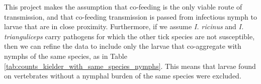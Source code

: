 \documentclass{article}
\begin{document}
This project makes the assumption that co-feeding is the only viable route of transmission, and that co-feeding transmission is passed from infectious nymph to larvae that are in close proximity. Furthermore, if we assume \textit{I. ricinus} and \textit{I. trianguliceps} carry pathogens for which the other tick species are not susceptible, then we can refine the data to include only the larvae that co-aggregate with nymphs of the same species, as in Table \ref{tab:counts_kielder_with_same_species_nymphs}. This means that larvae found on vertebrates without a nymphal burden of the same species were excluded.

\end{document}
